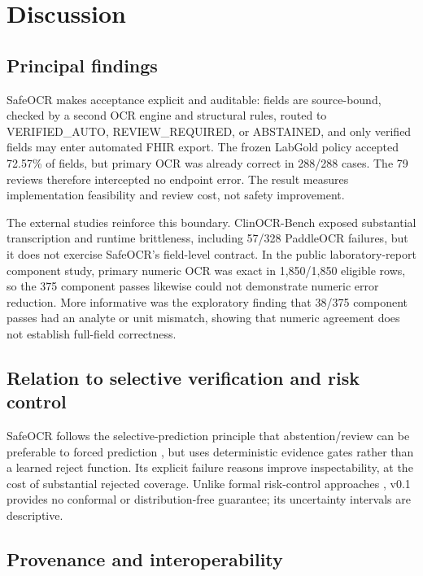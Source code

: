 \documentclass[10pt]{article}
\begin{document}
\section{Discussion}

\subsection{Principal findings}

SafeOCR makes acceptance explicit and auditable: fields are source-bound, checked by a second OCR engine and structural rules, routed to VERIFIED\_AUTO, REVIEW\_REQUIRED, or ABSTAINED, and only verified fields may enter automated FHIR export. The frozen LabGold policy accepted 72.57\% of fields, but primary OCR was already correct in 288/288 cases. The 79 reviews therefore intercepted no endpoint error. The result measures implementation feasibility and review cost, not safety improvement.

The external studies reinforce this boundary. ClinOCR-Bench exposed substantial transcription and runtime brittleness, including 57/328 PaddleOCR failures, but it does not exercise SafeOCR's field-level contract. In the public laboratory-report component study, primary numeric OCR was exact in 1,850/1,850 eligible rows, so the 375 component passes likewise could not demonstrate numeric error reduction. More informative was the exploratory finding that 38/375 component passes had an analyte or unit mismatch, showing that numeric agreement does not establish full-field correctness.

\subsection{Relation to selective verification and risk control}

SafeOCR follows the selective-prediction principle that abstention/review can be preferable to forced prediction \cite{swaminathan2024selective,geifman2019selectivenet}, but uses deterministic evidence gates rather than a learned reject function. Its explicit failure reasons improve inspectability, at the cost of substantial rejected coverage. Unlike formal risk-control approaches \cite{angelopoulos2025learntest,kim2025conformalEHR}, v0.1 provides no conformal or distribution-free guarantee; its uncertainty intervals are descriptive.

\subsection{Provenance and interoperability}
\end{document}
